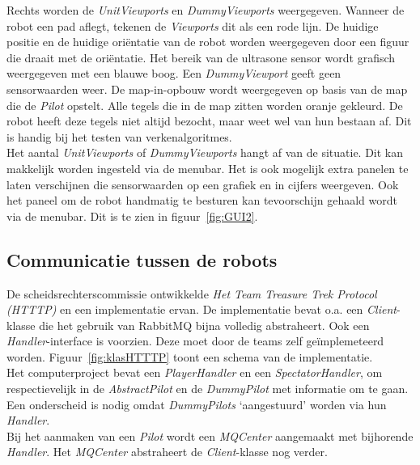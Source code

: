 \documentclass[tt3]{penoverslag}
\begin{document}
Rechts worden de \textit{UnitViewports} en \textit{DummyViewports} weergegeven. Wanneer de robot een pad aflegt, tekenen de \textit{Viewports} dit als een rode lijn. De huidige positie en de huidige ori\"entatie van de robot worden weergegeven door een figuur die draait met de ori\"entatie. Het bereik van de ultrasone sensor wordt grafisch weergegeven met een blauwe boog. Een \textit{DummyViewport} geeft geen sensorwaarden weer. De map-in-opbouw wordt weergegeven op basis van de map die de \textit{Pilot} opstelt. Alle tegels die in de map zitten worden oranje gekleurd. De robot heeft deze tegels niet altijd bezocht, maar weet wel van hun bestaan af. Dit is handig bij het testen van verkenalgoritmes.\\

Het aantal \textit{UnitViewports} of \textit{DummyViewports} hangt af van de situatie. Dit kan makkelijk worden ingesteld via de menubar. Het is ook mogelijk extra panelen te laten verschijnen die sensorwaarden op een grafiek en in cijfers weergeven. Ook het paneel om de robot handmatig te besturen kan tevoorschijn gehaald wordt via de menubar. Dit is te zien in figuur~\ref{fig:GUI2}.

\subsection{Communicatie tussen de robots}
\label{ssec:RabbMQ}
De scheidsrechterscommissie ontwikkelde \textit{Het Team Treasure Trek Protocol (HTTTP)} en een implementatie ervan. De implementatie bevat o.a. een \textit{Client}-klasse die het gebruik van RabbitMQ bijna volledig abstraheert. Ook een \textit{Handler}-interface is voorzien. Deze moet door de teams zelf ge\"implemeteerd worden. Figuur~\ref{fig:klasHTTTP} toont een schema van de implementatie.\\

Het computerproject bevat een \textit{PlayerHandler} en een \textit{SpectatorHandler}, om respectievelijk in de \textit{AbstractPilot} en de \textit{DummyPilot} met informatie om te gaan. Een onderscheid is nodig omdat \textit{DummyPilots} `aangestuurd' worden via hun \textit{Handler}.\\

Bij het aanmaken van een \textit{Pilot} wordt een \textit{MQCenter} aangemaakt met bijhorende \textit{Handler}. Het \textit{MQCenter} abstraheert de \textit{Client}-klasse nog verder.
\end{document}
